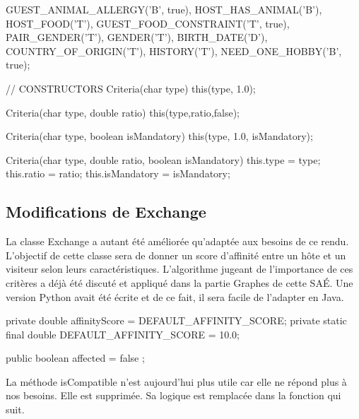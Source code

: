 \documentclass{mytex}
\begin{document}

\begin{codebox}
GUEST_ANIMAL_ALLERGY('B', true),
HOST_HAS_ANIMAL('B'),
HOST_FOOD('T'),
GUEST_FOOD_CONSTRAINT('T', true),
PAIR_GENDER('T'),
GENDER('T'),
BIRTH_DATE('D'),
COUNTRY_OF_ORIGIN('T'),
HISTORY('T'),
NEED_ONE_HOBBY('B', true);
\end{codebox}


\begin{codebox}
// CONSTRUCTORS
Criteria(char type) {
	this(type, 1.0);
}

Criteria(char type, double ratio) {
	this(type,ratio,false);
}

Criteria(char type, boolean isMandatory) {
	this(type, 1.0, isMandatory);
}

Criteria(char type, double ratio, boolean isMandatory) {
	this.type = type;
	this.ratio = ratio;
	this.isMandatory = isMandatory;
}
\end{codebox}

\subsection{Modifications de Exchange}

La classe Exchange a autant été améliorée qu'adaptée aux besoins de ce rendu. L'objectif de cette classe sera de donner un score d'affinité entre un hôte et un visiteur selon leurs caractéristiques. L'algorithme jugeant de l'importance de ces critères a déjà été discuté et appliqué dans la partie Graphes de cette SAÉ. Une version Python avait été écrite et de ce fait, il sera facile de l'adapter en Java.


\begin{codebox}
private double affinityScore = DEFAULT_AFFINITY_SCORE;
private static final double DEFAULT_AFFINITY_SCORE = 10.0;

public boolean affected = false ;
\end{codebox}


La méthode isCompatible n'est aujourd'hui plus utile car elle ne répond plus à nos besoins. Elle est supprimée. Sa logique est remplacée dans la fonction qui suit.

\end{document}
